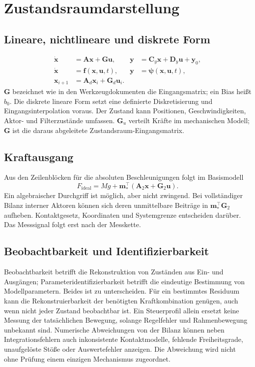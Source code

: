 \documentclass[11pt,a4paper]{article}
\begin{document}
\section{Zustandsraumdarstellung}\label{sec:zustandsraum}
\subsection{Lineare, nichtlineare und diskrete Form}
\begin{align}
\dot{\mathbf x}&=\mathbf A\mathbf x+\mathbf G\mathbf u, &
\mathbf y&=\mathbf C_y\mathbf x+\mathbf D_y\mathbf u+\mathbf y_0,\\
\dot{\mathbf x}&=\mathbf f(\mathbf x,\mathbf u,t), &
\mathbf y&=\boldsymbol\psi(\mathbf x,\mathbf u,t),\\
\mathbf x_{i+1}&=\mathbf A_d\mathbf x_i+\mathbf G_d\mathbf u_i.
\end{align}
$\mathbf G$ bezeichnet wie in den Werkzeugdokumenten die Eingangsmatrix; ein Bias heißt $b_0$. Die diskrete lineare Form setzt eine definierte Diskretisierung und Eingangsinterpolation voraus. Der Zustand kann Positionen, Geschwindigkeiten, Aktor- und Filterzustände umfassen. $\mathbf G_u$ verteilt Kräfte im mechanischen Modell; $\mathbf G$ ist die daraus abgeleitete Zustandsraum-Eingangsmatrix.

\subsection{Kraftausgang}
Aus den Zeilenblöcken für die absoluten Beschleunigungen folgt im Basismodell
\begin{equation}
F_{\mathrm{ideal}}=Mg+\mathbf m_*^\top(\mathbf A_2\mathbf x+\mathbf G_2\mathbf u).
\end{equation}
Ein algebraischer Durchgriff ist möglich, aber nicht zwingend. Bei vollständiger Bilanz interner Aktoren können sich deren unmittelbare Beiträge in $\mathbf m_*^\top\mathbf G_2$ aufheben. Kontaktgesetz, Koordinaten und Systemgrenze entscheiden darüber. Das Messsignal folgt erst nach der Messkette.

\subsection{Beobachtbarkeit und Identifizierbarkeit}
Beobachtbarkeit betrifft die Rekonstruktion von Zuständen aus Ein- und Ausgängen; Pa\-ra\-me\-ter\-iden\-ti\-fi\-zier\-bar\-keit betrifft die eindeutige Bestimmung von Modellparametern. Beides ist zu unterscheiden. Für ein bestimmtes Residuum kann die Rekonstruierbarkeit der benötigten Kraftkombination genügen, auch wenn nicht jeder Zustand beobachtbar ist. Ein Steuerprofil allein ersetzt keine Messung der tatsächlichen Bewegung, solange Regelfehler und Rahmenbewegung unbekannt sind.
Numerische Abweichungen von der Bilanz können neben Integrationsfehlern auch inkonsistente Kontaktmodelle, fehlende Freiheitsgrade, unaufgelöste Stöße oder Auswertefehler anzeigen. Die Abweichung wird nicht ohne Prüfung einem einzigen Mechanismus zugeordnet.
\end{document}
